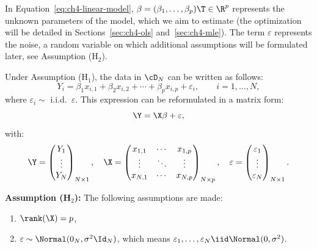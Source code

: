 \begin{remark}
In Equation~\eqref{eq:ch4-linear-model}, $\beta = (\beta_1, \ldots, \beta_p)\T \in \R^p$ represents the
unknown parameters of the model, which we aim to estimate (the optimization
will be detailed in Sections~\ref{sec:ch4-ols} and~\ref{sec:ch4-mle}). The term $\varepsilon$ represents the
noise, a random variable on which additional assumptions will be formulated
later, see Assumption (H$_2$).
\end{remark}

Under Assumption (H$_1$), the data in $\cD_N$ can be written as follows:
\begin{equation}\label{eq:ch4-data-scalar}
Y_i = \beta_1 x_{i,1} + \beta_2 x_{i,2} + \cdots + \beta_p x_{i,p} + \varepsilon_i, \qquad i = 1, \ldots, N,
\end{equation}
where $\varepsilon_i \sim$ i.i.d.~$\varepsilon$. This expression can be reformulated in a matrix form:
\begin{equation}\label{eq:ch4-data-matrix}
\Y = \X \beta + \varepsilon,
\end{equation}
with:
\[
\Y = \begin{pmatrix} Y_1 \\ \vdots \\ Y_N \end{pmatrix}_{N \times 1}, \quad
\X = \begin{pmatrix} x_{1,1} & \cdots & x_{1,p} \\ \vdots & \ddots & \vdots \\ x_{N,1} & \cdots & x_{N,p} \end{pmatrix}_{N \times p}, \quad
\varepsilon = \begin{pmatrix} \varepsilon_1 \\ \vdots \\ \varepsilon_N \end{pmatrix}_{N \times 1}.
\]

\begin{tcolorbox}[remarkbox]
\textbf{Assumption (H$_2$):} The following assumptions are made:
\begin{enumerate}
\item $\rank(\X) = p$,
\item $\varepsilon \sim \Normal(0_N, \sigma^2 \Id_N)$, which means $\varepsilon_1, \ldots, \varepsilon_N \iid \Normal(0, \sigma^2)$.
\end{enumerate}
\end{tcolorbox}

